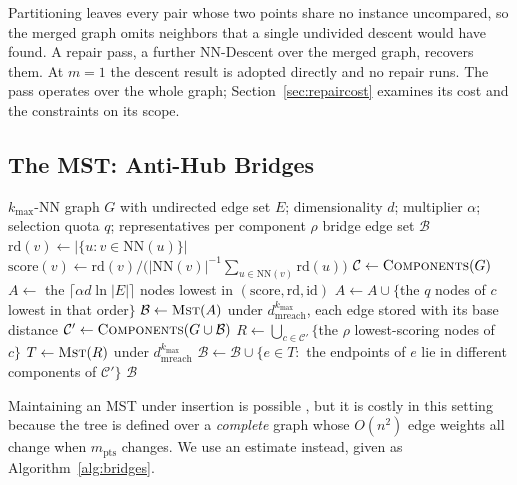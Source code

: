 \documentclass{ieeeaccess}
\newcommand{\kmax}{k_{\max}}
\newcommand{\mpts}{m_{\mathrm{pts}}}
\newcommand{\mrd}{d_{\mathrm{mreach}}}
\begin{document}
Partitioning leaves every pair whose two points share no instance uncompared, so
the merged graph omits neighbors that a single undivided descent would have
found. A repair pass, a further NN-Descent over the merged graph, recovers them.
At $m = 1$ the descent result is adopted directly and no repair runs. The pass
operates over the whole graph; Section~\ref{sec:repaircost} examines its cost and
the constraints on its scope.

\subsection{The MST: Anti-Hub Bridges}
\label{sec:bridges}

\begin{algorithm}[!t]
\caption{The spanning-tree half, estimated from anti-hubs}
\label{alg:bridges}
\begin{algorithmic}[1]
\REQUIRE $\kmax$-NN graph $G$ with undirected edge set $E$; dimensionality $d$;
         multiplier $\alpha$; selection quota $q$; representatives per component
         $\rho$
\ENSURE bridge edge set $\mathcal{B}$
  \STATE $\mathrm{rd}(v) \gets |\{u : v \in \mathrm{NN}(u)\}|$
\ENDFOR
{}
  \STATE $\mathrm{score}(v) \gets \mathrm{rd}(v) \big/ \big(
         |\mathrm{NN}(v)|^{-1}\textstyle\sum_{u \in \mathrm{NN}(v)}
         \mathrm{rd}(u) \big)$  \COMMENT{\eqref{eq:score}}
\ENDFOR
\STATE $\mathcal{C} \gets \textsc{Components}(G)$
\STATE $A \gets$ the $\lceil \alpha d \ln|E| \rceil$ nodes lowest in
       $(\mathrm{score}, \mathrm{rd}, \mathrm{id})$
  \STATE $A \gets A \cup \{$the $q$ nodes of $c$ lowest in that order$\}$
\ENDFOR
\STATE $\mathcal{B} \gets \textsc{Mst}(A)$ under $\mrd^{\kmax}$, each edge
       stored with its base distance
\STATE $\mathcal{C}' \gets \textsc{Components}(G \cup \mathcal{B})$
  \STATE $R \gets \bigcup_{c \in \mathcal{C}'} \{$the $\rho$ lowest-scoring
         nodes of $c\}$
  \STATE $T \gets \textsc{Mst}(R)$ under $\mrd^{\kmax}$
  \STATE $\mathcal{B} \gets \mathcal{B} \cup \{e \in T :$ the endpoints of $e$
         lie in different components of $\mathcal{C}'\}$
\ENDIF
\RETURN $\mathcal{B}$
\end{algorithmic}
\end{algorithm}

Maintaining an MST under insertion is possible \cite{mst_maintenance}, but it is
costly in this setting because the tree is defined over a \emph{complete} graph
whose $O(n^2)$ edge weights all change when $\mpts$ changes. We use an estimate
instead, given as Algorithm~\ref{alg:bridges}.
\end{document}
